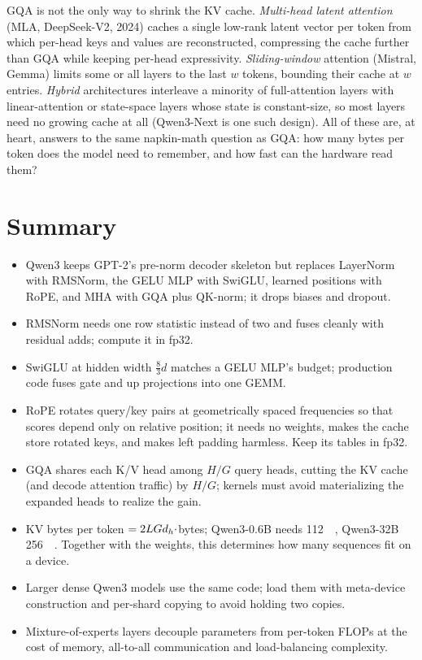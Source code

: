 \begin{deepdive}
GQA is not the only way to shrink the KV cache. \emph{Multi-head latent attention} (MLA, DeepSeek-V2,
2024) caches a single low-rank latent vector per token from which per-head keys and values are
reconstructed, compressing the cache further than GQA while keeping per-head expressivity.
\emph{Sliding-window} attention (Mistral, Gemma) limits some or all layers to the last $w$ tokens, bounding
their cache at $w$ entries. \emph{Hybrid} architectures interleave a minority of full-attention layers
with linear-attention or state-space layers whose state is constant-size, so most layers need no
growing cache at all (Qwen3-Next is one such design). All of these are, at heart, answers to the same
napkin-math question as GQA: how many bytes per token does the model need to remember, and how fast can
the hardware read them?
\end{deepdive}

\section{Summary}
\begin{itemize}
\item Qwen3 keeps GPT-2's pre-norm decoder skeleton but replaces LayerNorm with RMSNorm, the GELU MLP with
  SwiGLU, learned positions with RoPE, and MHA with GQA plus QK-norm; it drops biases and dropout.
\item RMSNorm needs one row statistic instead of two and fuses cleanly with residual adds; compute it in
  fp32.
\item SwiGLU at hidden width $\tfrac83 d$ matches a GELU MLP's budget; production code fuses gate and up
  projections into one GEMM.
\item RoPE rotates query/key pairs at geometrically spaced frequencies so that scores depend only on
  relative position; it needs no weights, makes the cache store rotated keys, and makes left padding
  harmless. Keep its tables in fp32.
\item GQA shares each K/V head among $H/G$ query heads, cutting the KV cache (and decode attention
  traffic) by $H/G$; kernels must avoid materializing the expanded heads to realize the gain.
\item KV bytes per token $=2LGd_{h}\cdot$bytes; Qwen3-0.6B needs \SI{112}{\kibi\byte}, Qwen3-32B
  \SI{256}{\kibi\byte}. Together with the weights, this determines how many sequences fit on a device.
\item Larger dense Qwen3 models use the same code; load them with meta-device construction and per-shard
  copying to avoid holding two copies.
\item Mixture-of-experts layers decouple parameters from per-token FLOPs at the cost of memory, all-to-all
  communication and load-balancing complexity.
\end{itemize}

